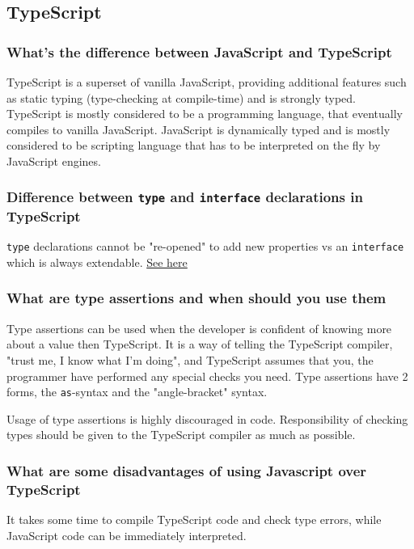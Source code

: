 \documentclass[12pt, a4paper]{article}
\newcommand{\code}[1]{\texttt{#1}}
\begin{document}
\pagebreak

\subsection*{TypeScript}

\subsubsection*{What's the difference between JavaScript and TypeScript}
TypeScript is a superset of vanilla JavaScript, providing additional features such as static typing (type-checking at compile-time) and is strongly typed.
TypeScript is mostly considered to be a programming language, that eventually compiles to vanilla JavaScript.\newline
JavaScript is dynamically typed and is mostly considered to be scripting language that has to be interpreted on the fly by JavaScript engines.

\subsubsection*{Difference between \code{type} and \code{interface} declarations in TypeScript}
\code{type} declarations cannot be "re-opened" to add new properties vs an \code{interface} which is always extendable.
\href{https://www.typescriptlang.org/docs/handbook/2/everyday-types.html#differences-between-type-aliases-and-interfaces}{See here}

\subsubsection*{What are type assertions and when should you use them}
Type assertions can be used when the developer is confident of knowing more about a value then TypeScript.
It is a way of telling the TypeScript compiler, "trust me, I know what I'm doing", and TypeScript assumes that you, the programmer have performed any special checks you need.
Type assertions have 2 forms, the \code{as}-syntax and the "angle-bracket" syntax.

Usage of type assertions is highly discouraged in code.
Responsibility of checking types should be given to the TypeScript compiler as much as possible.

\subsubsection*{What are some disadvantages of using Javascript over TypeScript}
It takes some time to compile TypeScript code and check type errors, while JavaScript code can be immediately interpreted.
\end{document}
